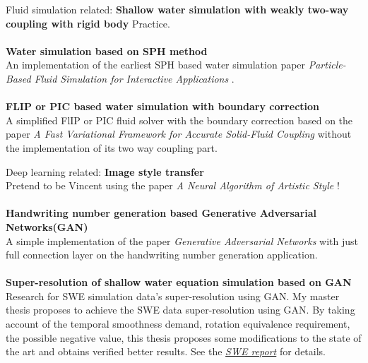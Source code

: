 \documentclass{article} %
\begin{document}
\begin{section}{Fluid simulation related:}
  {\bf Shallow water simulation with weakly two-way coupling with rigid body} Practice.\\\\
  {\bf Water simulation based on SPH method}\\An implementation of the earliest SPH based water simulation paper \emph{Particle-Based Fluid Simulation for Interactive Applications} \cite{muller2003particle}.\\\\                
  {\bf FLIP or PIC based water simulation with boundary correction}\\A simplified FlIP or PIC fluid solver with the boundary correction based on the paper \emph{A Fast Variational Framework for Accurate Solid-Fluid Coupling} \cite{batty2007fast} without the implementation of its two way coupling part.
\end{section}
\begin{section}{Deep learning related:}
  {\bf Image style transfer}\\Pretend to be Vincent using the paper \emph{A Neural Algorithm of Artistic Style} \cite{gatys2015neural}!\\\\
  {\bf Handwriting number generation based Generative Adversarial Networks(GAN)}\\ A simple implementation of the paper \emph{Generative Adversarial Networks} \cite{radford2015unsupervised} with just full connection layer on the handwriting number generation application.\\\\
  {\bf Super-resolution of shallow water equation simulation based on GAN}\\ Research for SWE simulation data's super-resolution using GAN. My master thesis proposes to achieve the SWE data super-resolution using GAN. By taking account of the temporal smoothness demand, rotation equivalence requirement, the possible negative value, this thesis proposes some modifications to the state of the art and obtains verified better results. See the \emph{\href{https://wtyatzoo.github.io/reports/SWE.pdf}{SWE report}} for details.         
\end{section}
\end{document}

